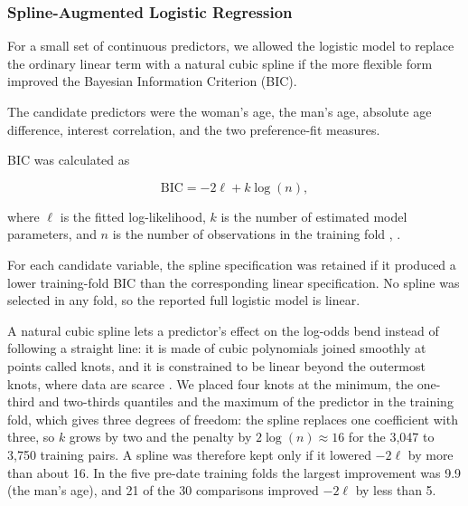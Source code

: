 \subsubsection{Spline-Augmented Logistic Regression}

For a small set of continuous predictors, we allowed the logistic model to replace the ordinary linear term with a natural cubic spline \cite[Section 7.4.3, p.~297]{James:2023} if the more flexible form improved the Bayesian Information Criterion (BIC).

The candidate predictors were the woman's age, the man's age, absolute age difference, interest correlation, and the two preference-fit measures.

BIC was calculated as

\begin{equation}
\mathrm{BIC}
=
-2\ell
+
k\log(n),
\end{equation}

where $\ell$ is the fitted log-likelihood, $k$ is the number of estimated model parameters, and $n$ is the number of observations in the training fold \cite[Section 7.7, Eq.~(7.35), p.~233]{Hastie:2009}, \cite[Section 6.1.3, p.~237]{James:2023}.

For each candidate variable, the spline specification was retained if it produced a lower training-fold BIC than the corresponding linear specification. No spline was selected in any fold, so the reported full logistic model is linear.

A natural cubic spline lets a predictor's effect on the log-odds bend instead of following a straight line: it is made of cubic polynomials joined smoothly at points called knots, and it is constrained to be linear beyond the outermost knots, where data are scarce \cite[Section 7.4.3, p.~297]{James:2023}. We placed four knots at the minimum, the one-third and two-thirds quantiles and the maximum of the predictor in the training fold, which gives three degrees of freedom: the spline replaces one coefficient with three, so $k$ grows by two and the penalty by $2\log(n)\approx 16$ for the 3{,}047 to 3{,}750 training pairs. A spline was therefore kept only if it lowered $-2\ell$ by more than about 16. In the five pre-date training folds the largest improvement was 9.9 (the man's age), and 21 of the 30 comparisons improved $-2\ell$ by less than 5.

